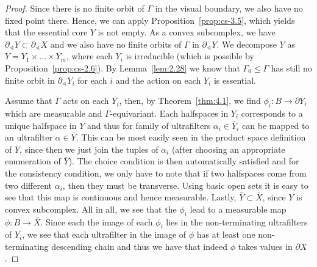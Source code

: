 \begin{proof}
  Since there is no finite orbit of \(\Gamma\) in the visual boundary, we also have no fixed point there. Hence, we can apply Proposition~\ref{prop:cs-3.5}, which yields that the essential core \(Y\) is not empty. As a convex subcomplex, we have \(\partial_\sphericalangle Y \subset \partial_\sphericalangle X\) and we also have no finite orbits of \(\Gamma\) in \(\partial_\sphericalangle Y\). We decompose \(Y\) as \(Y = Y_1 \times \dots \times Y_m\), where each \(Y_i\) is irreducible (which is possible by Proposition~\ref{prop:cs-2.6}). By Lemma~\ref{lem:2.28} we know that \(\Gamma_0 \leq \Gamma\) has still no finite orbit in \(\partial_\sphericalangle Y_i\) for each \(i\) and the action on each \(Y_i\) is essential.

  Assume that \(\Gamma\) acts on each \(Y_i\), then, by Theorem~\ref{thm:4.1}, we find \(\phi_i \colon B \to \partial Y_i\) which are measurable and \(\Gamma\)-equivariant. Each halfspaces in \(Y_i\) corresponds to a unique halfspace in \(Y\) and thus for family of ultrafilters \(\alpha_i \in \bar Y_i\) can be mapped to an ultrafilter \(\alpha \in \bar Y\). This can be most easily seen in the product space definition of \(\bar Y\), since then we just join the tuples of \(\alpha_i\) (after choosing an appropriate enumeration of \(\bar Y\)). The choice condition is then automatically satisfied and for the consistency condition, we only have to note that if two halfspaces come from two different \(\alpha_i\), then they must be transverse. Using basic open sets it is easy to see that this map is continuous and hence measurable. Lastly, \(\bar Y \subset \bar X\), since \(Y\) is convex subcomplex. All in all, we see that the \(\phi_i\) lead to a measurable map \(\phi\colon B \to \bar X\). Since each the image of each \(\phi_i\) lies in the non-terminating ultrafilters of \(Y_i\), we see that each ultrafilter in the image of \(\phi\) has at least one non-terminating descending chain and thus we have that indeed \(\phi\) takes values in \(\partial X\).
\end{proof}

